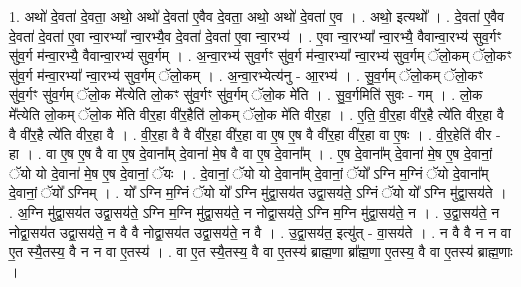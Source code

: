 \documentclass[17pt]{extarticle}
\begin{document}
1. अथो॑ दे॒वता॑ दे॒वता॒ अथो॒ अथो॑ दे॒वता॑ ए॒वैव दे॒वता॒ अथो॒ अथो॑ दे॒वता॑ ए॒व । . अथो॒ इत्यथो᳚ । . दे॒वता॑ ए॒वैव दे॒वता॑ दे॒वता॑ ए॒वा न्वा॒रभ्या᳚ न्वा॒रभ्यै॒व दे॒वता॑ दे॒वता॑ ए॒वा न्वा॒रभ्य॑ । . ए॒वा न्वा॒रभ्या᳚ न्वा॒रभ्यै॒ वैवान्वा॒रभ्य॑ सुव॒र्गꣳ सु॑व॒र्ग म॑न्वा॒रभ्यै॒ वैवान्वा॒रभ्य॑ सुव॒र्गम् । . अ॒न्वा॒रभ्य॑ सुव॒र्गꣳ सु॑व॒र्ग म॑न्वा॒रभ्या᳚ न्वा॒रभ्य॑ सुव॒र्गम् ॅलो॒कम् ॅलो॒कꣳ सु॑व॒र्ग म॑न्वा॒रभ्या᳚ न्वा॒रभ्य॑ सुव॒र्गम् ॅलो॒कम् । . अ॒न्वा॒रभ्येत्य॑नु - आ॒रभ्य॑ । . सु॒व॒र्गम् ॅलो॒कम् ॅलो॒कꣳ सु॑व॒र्गꣳ सु॑व॒र्गम् ॅलो॒क मे᳚त्येति लो॒कꣳ सु॑व॒र्गꣳ सु॑व॒र्गम् ॅलो॒क मे॑ति । . सु॒व॒र्गमिति॑ सुवः - गम् । . लो॒क मे᳚त्येति लो॒कम् ॅलो॒क मे॑ति वीर॒हा वी॑र॒हैति॑ लो॒कम् ॅलो॒क मे॑ति वीर॒हा । . ए॒ति॒ वी॒र॒हा वी॑र॒है त्ये॑ति वीर॒हा वै वै वी॑र॒है त्ये॑ति वीर॒हा वै । . वी॒र॒हा वै वै वी॑र॒हा वी॑र॒हा वा ए॒ष ए॒ष वै वी॑र॒हा वी॑र॒हा वा ए॒षः । . वी॒र॒हेति॑ वीर - हा । . वा ए॒ष ए॒ष वै वा ए॒ष दे॒वाना᳚म् दे॒वाना॑ मे॒ष वै वा ए॒ष दे॒वाना᳚म् । . ए॒ष दे॒वाना᳚म् दे॒वाना॑ मे॒ष ए॒ष दे॒वानां॒ ॅयो यो दे॒वाना॑ मे॒ष ए॒ष दे॒वानां॒ ॅयः । . दे॒वानां॒ ॅयो यो दे॒वाना᳚म् दे॒वानां॒ ॅयो᳚ ऽग्नि म॒ग्निं ॅयो दे॒वाना᳚म् दे॒वानां॒ ॅयो᳚ ऽग्निम् । . यो᳚ ऽग्नि म॒ग्निं ॅयो यो᳚ ऽग्नि मु॑द्वा॒सय॑त उद्वा॒सय॑ते॒ ऽग्निं ॅयो यो᳚ ऽग्नि मु॑द्वा॒सय॑ते । . अ॒ग्नि मु॑द्वा॒सय॑त उद्वा॒सय॑ते॒ ऽग्नि म॒ग्नि मु॑द्वा॒सय॑ते॒ न नोद्वा॒सय॑ते॒ ऽग्नि म॒ग्नि मु॑द्वा॒सय॑ते॒ न । . उ॒द्वा॒सय॑ते॒ न नोद्वा॒सय॑त उद्वा॒सय॑ते॒ न वै वै नोद्वा॒सय॑त उद्वा॒सय॑ते॒ न वै । . उ॒द्वा॒सय॑त॒ इत्यु॑त् - वा॒सय॑ते । . न वै वै न न वा ए॒त स्यै॒तस्य॒ वै न न वा ए॒तस्य॑ । . वा ए॒त स्यै॒तस्य॒ वै वा ए॒तस्य॑ ब्राह्म॒णा ब्रा᳚ह्म॒णा ए॒तस्य॒ वै वा ए॒तस्य॑ ब्राह्म॒णाः । \newline
\end{document}
